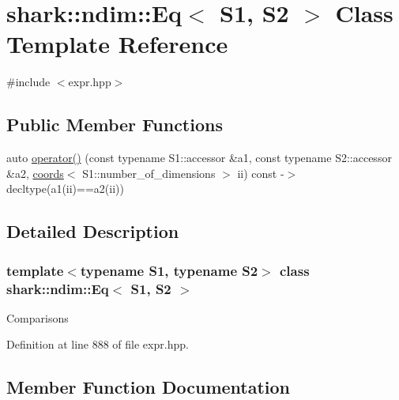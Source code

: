 \hypertarget{classshark_1_1ndim_1_1_eq}{}\section{shark\+:\+:ndim\+:\+:Eq$<$ S1, S2 $>$ Class Template Reference}
\label{classshark_1_1ndim_1_1_eq}


{\ttfamily \#include $<$expr.\+hpp$>$}

\subsection*{Public Member Functions}
\begin{DoxyCompactItemize}
\item 
auto \hyperlink{classshark_1_1ndim_1_1_eq_a3d6db8cfe90353585a4ebcd720e07abb}{operator()} (const typename S1\+::accessor \&a1, const typename S2\+::accessor \&a2, \hyperlink{structshark_1_1ndim_1_1coords}{coords}$<$ S1\+::number\+\_\+of\+\_\+dimensions $>$ ii) const -\/$>$ decltype(a1(ii)==a2(ii))
\end{DoxyCompactItemize}


\subsection{Detailed Description}
\subsubsection*{template$<$typename S1, typename S2$>$\newline
class shark\+::ndim\+::\+Eq$<$ S1, S2 $>$}

Comparisons 

Definition at line 888 of file expr.\+hpp.



\subsection{Member Function Documentation}
\hypertarget{classshark_1_1ndim_1_1_eq_a3d6db8cfe90353585a4ebcd720e07abb}{}\label{classshark_1_1ndim_1_1_eq_a3d6db8cfe90353585a4ebcd720e07abb} 
